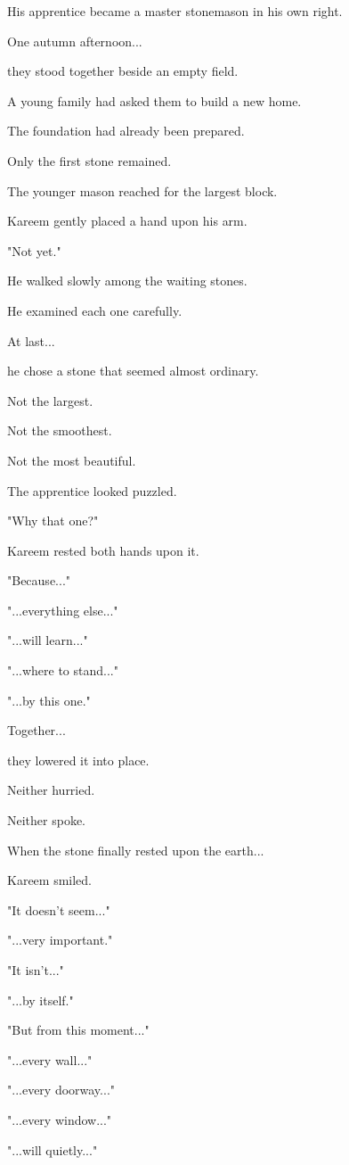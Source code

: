 \documentclass[12pt,openany]{book}
\begin{document}
His apprentice became a master stonemason in his own right.

One autumn afternoon...

they stood together beside an empty field.

A young family had asked them to build a new home.

The foundation had already been prepared.

Only the first stone remained.

The younger mason reached for the largest block.

Kareem gently placed a hand upon his arm.

"Not yet."

He walked slowly among the waiting stones.

He examined each one carefully.

At last...

he chose a stone that seemed almost ordinary.

Not the largest.

Not the smoothest.

Not the most beautiful.

The apprentice looked puzzled.

"Why that one?"

Kareem rested both hands upon it.

"Because..."

"...everything else..."

"...will learn..."

"...where to stand..."

"...by this one."

Together...

they lowered it into place.

Neither hurried.

Neither spoke.

When the stone finally rested upon the earth...

Kareem smiled.

"It doesn't seem..."

"...very important."

"It isn't..."

"...by itself."

"But from this moment..."

"...every wall..."

"...every doorway..."

"...every window..."

"...will quietly..."
\end{document}
